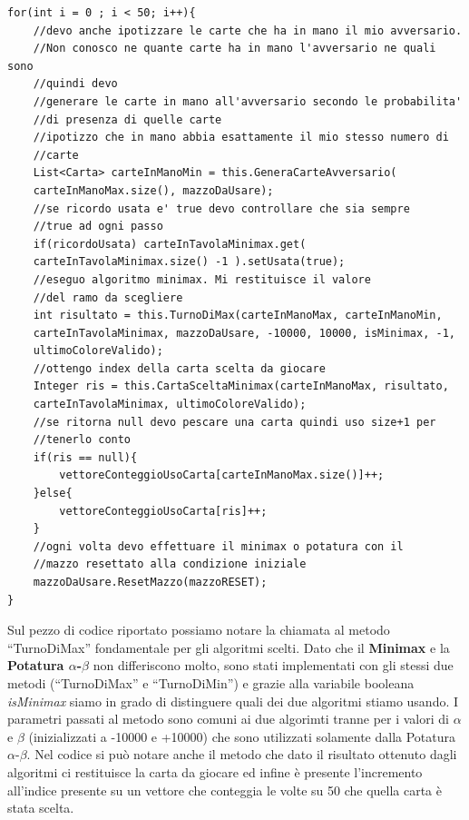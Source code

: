 \begin{lstlisting}
for(int i = 0 ; i < 50; i++){
    //devo anche ipotizzare le carte che ha in mano il mio avversario. 
    //Non conosco ne quante carte ha in mano l'avversario ne quali sono
    //quindi devo
    //generare le carte in mano all'avversario secondo le probabilita'
    //di presenza di quelle carte
    //ipotizzo che in mano abbia esattamente il mio stesso numero di
    //carte
    List<Carta> carteInManoMin = this.GeneraCarteAvversario(
    carteInManoMax.size(), mazzoDaUsare); 
    //se ricordo usata e' true devo controllare che sia sempre 
    //true ad ogni passo
    if(ricordoUsata) carteInTavolaMinimax.get(
    carteInTavolaMinimax.size() -1 ).setUsata(true);
    //eseguo algoritmo minimax. Mi restituisce il valore
    //del ramo da scegliere
    int risultato = this.TurnoDiMax(carteInManoMax, carteInManoMin,
    carteInTavolaMinimax, mazzoDaUsare, -10000, 10000, isMinimax, -1,
    ultimoColoreValido);
    //ottengo index della carta scelta da giocare
    Integer ris = this.CartaSceltaMinimax(carteInManoMax, risultato,
    carteInTavolaMinimax, ultimoColoreValido);
    //se ritorna null devo pescare una carta quindi uso size+1 per
    //tenerlo conto
    if(ris == null){
        vettoreConteggioUsoCarta[carteInManoMax.size()]++;
    }else{
        vettoreConteggioUsoCarta[ris]++;
    }
    //ogni volta devo effettuare il minimax o potatura con il
    //mazzo resettato alla condizione iniziale
    mazzoDaUsare.ResetMazzo(mazzoRESET);
}
\end{lstlisting}
		
		Sul pezzo di codice riportato possiamo notare la chiamata al metodo ``TurnoDiMax'' fondamentale per gli algoritmi scelti. Dato che il \textbf{Minimax} e la \textbf{Potatura $\alpha$-$\beta$} non differiscono molto, sono stati implementati con gli stessi due metodi (``TurnoDiMax'' e ``TurnoDiMin'') e grazie alla variabile booleana \textit{isMinimax} siamo in grado di distinguere quali dei due algoritmi stiamo usando. I parametri passati al metodo sono comuni ai due algorimti tranne per i valori di $\alpha$ e $\beta$ (inizializzati a -10000 e +10000) che sono utilizzati solamente dalla Potatura $\alpha$-$\beta$. Nel codice si può notare anche il metodo che dato il risultato ottenuto dagli algoritmi ci restituisce la carta da giocare ed infine è presente l'incremento all'indice presente su un vettore che conteggia le volte su 50 che quella carta è stata scelta.
		
